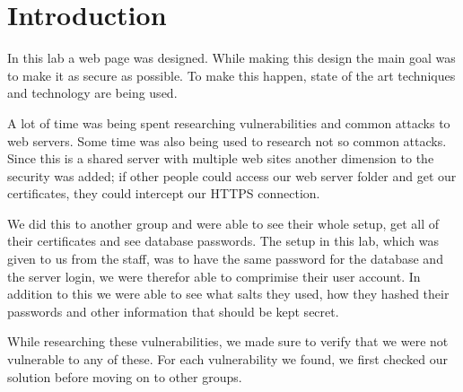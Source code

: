 \section{Introduction}

In this lab a web page was designed.
While making this design the main goal was to make it as secure as possible.
To make this happen, state of the art techniques and technology are being used.

A lot of time was being spent researching vulnerabilities and common attacks to web servers.
Some time was also being used to research not so common attacks.
Since this is a shared server with multiple web sites another dimension to the security was added;
if other people could access our web server folder and get our certificates, they could intercept our HTTPS connection.

We did this to another group and were able to see their whole setup, get all of their certificates and see database passwords.
The setup in this lab, which was given to us from the staff, was to have the same password for the database and the server login, we were therefor able to comprimise their user account.
In addition to this we were able to see what salts they used, how they hashed their passwords and other information that should be kept secret.

While researching these vulnerabilities, we made sure to verify that we were not vulnerable to any of these.
For each vulnerability we found, we first checked our solution before moving on to other groups.
